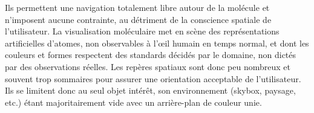 Ils permettent une navigation totalement libre autour de la molécule et n'imposent aucune contrainte, au détriment de la conscience spatiale de l'utilisateur. %
La visualisation moléculaire met en scène des représentations artificielles d'atomes, non observables à l’œil humain en temps normal, et dont les couleurs et formes respectent des standards décidés par le domaine, non dictés par des observations réelles. Les repères spatiaux sont donc peu nombreux et souvent trop sommaires pour assurer une orientation acceptable de l'utilisateur. Ils se limitent donc au seul objet intérêt, son environnement (skybox, paysage, etc.) étant majoritairement vide avec un arrière-plan de couleur unie.   
 

